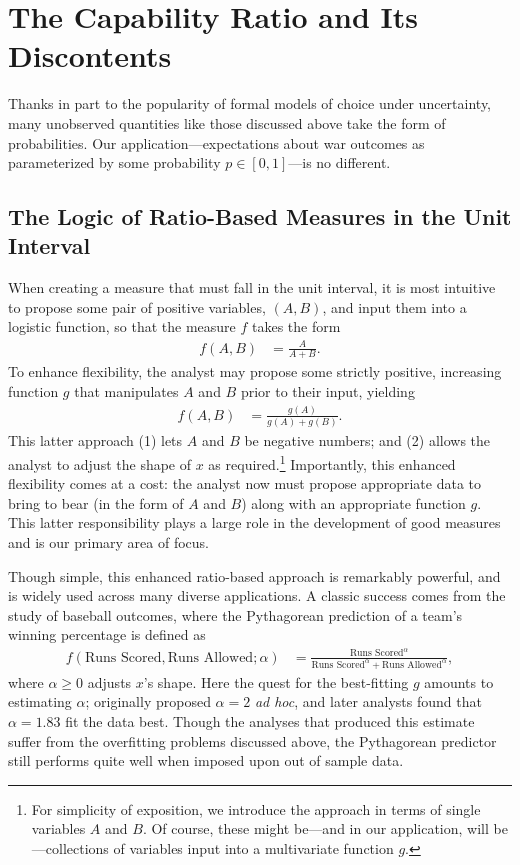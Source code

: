 \section{The Capability Ratio and Its Discontents}

Thanks in part to the popularity of formal models of choice under uncertainty, many unobserved quantities like those discussed above take the form of probabilities. 
Our application---expectations about war outcomes as parameterized by some probability $p \in [0,1]$---is no different.

\subsection{The Logic of Ratio-Based Measures in the Unit Interval}

When creating a measure that must fall in the unit interval, it is most intuitive to propose some pair of positive variables, $(A,B)$, and input them into a logistic function, so that the measure $f$ takes the form
\begin{align*}
  f(A,B) &= \frac{A}{A + B}.
\end{align*}
To enhance flexibility, the analyst may propose some strictly positive, increasing function $g$ that manipulates $A$ and $B$ prior to their input, yielding
\begin{align*}
  f(A,B) &= \frac{g(A)}{g(A) + g(B)}.
\end{align*}
This latter approach (1) lets $A$ and $B$ be negative numbers; and (2) allows the analyst to adjust the shape of $x$ as required.\footnote{For simplicity of exposition, we introduce the approach in terms of single variables $A$ and $B$. 
  Of course, these might be---and in our application, will be---collections of variables input into a multivariate function $g$.} 
Importantly, this enhanced flexibility comes at a cost: the analyst now must propose appropriate data to bring to bear (in the form of $A$ and $B$) along with an appropriate function $g$. 
This latter responsibility plays a large role in the development of good measures and is our primary area of focus.

Though simple, this enhanced ratio-based approach is remarkably powerful, and is widely used across many diverse applications. 
A classic success comes from the study of baseball outcomes, where the Pythagorean prediction \citep{james1983,miller2007} of a team's winning percentage is defined as
\begin{align*}
  f\left(\text{Runs Scored}, \text{Runs Allowed} ; \alpha\right) &= \frac{\text{Runs Scored}^\alpha}{\text{Runs Scored}^\alpha + \text{Runs Allowed}^\alpha},
\end{align*}
where $\alpha \geq 0$ adjusts $x$'s shape. 
Here the quest for the best-fitting $g$ amounts to estimating $\alpha$; \citet{james1983} originally proposed $\alpha = 2$ \emph{ad hoc}, and later analysts found that $\alpha = 1.83$ fit the data best. 
Though the analyses that produced this estimate suffer from the overfitting problems discussed above, the Pythagorean predictor still performs quite well when imposed upon out of sample data.


